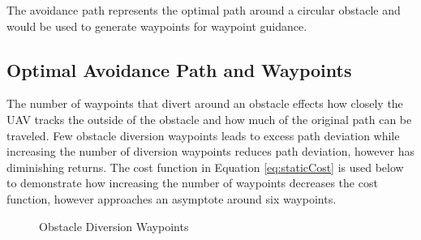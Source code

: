 \documentclass[numbered,pdftex]{ohio-etd}
\begin{document}
The avoidance path represents the optimal path around a circular obstacle and would be used to generate waypoints for waypoint guidance.

\subsection{Optimal Avoidance Path and Waypoints}

 The number of waypoints that divert around an obstacle effects how closely the UAV tracks the outside of the obstacle and how much of the original path can be traveled. Few obstacle diversion waypoints leads to excess path deviation while increasing the number of diversion waypoints reduces path deviation, however has diminishing returns. The cost function in Equation \ref{eq:staticCost} is used below to demonstrate how increasing the number of waypoints decreases the cost function, however approaches an asymptote around six waypoints.


\begin{figure}[H]
	\begin{subfigmatrix}{2}%
		\centering	
		\hspace*{0mm}
	\end{subfigmatrix}
	\caption{Obstacle Diversion Waypoints}
	\label{fig:numWaypointsPath}
\end{figure}
\end{document}
